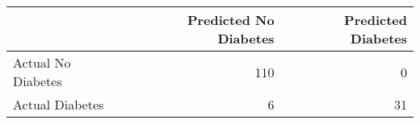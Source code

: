 \begin{tabular}{lrr}
\toprule
 & Predicted No Diabetes & Predicted Diabetes \\
\midrule
Actual No Diabetes & 110 & 0 \\
Actual Diabetes & 6 & 31 \\
\bottomrule
\end{tabular}
